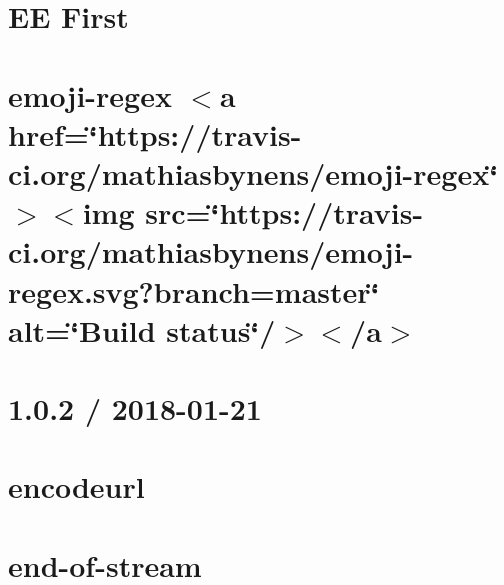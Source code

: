 \let\mypdfximage\pdfximage\def\pdfximage{\immediate\mypdfximage}\documentclass[twoside]{book}
\newcommand{\+}{\discretionary{\mbox{\scriptsize$\hookleftarrow$}}{}{}}
\begin{document}
\chapter{EE First}
\label{md__c_1__git_hub__p_r_o_y_e_c_t_o-_i_i_i-_g_o_t_rest-api_node_modules_ee-first__r_e_a_d_m_e}

\chapter{emoji-\/regex $<$a href=\char`\"{}https\+://travis-\/ci.\+org/mathiasbynens/emoji-\/regex\char`\"{}$>$$<$img src=\char`\"{}https\+://travis-\/ci.\+org/mathiasbynens/emoji-\/regex.\+svg?branch=master\char`\"{} alt=\char`\"{}\+Build status\char`\"{}/$>$$<$/a$>$}
\label{md__c_1__git_hub__p_r_o_y_e_c_t_o-_i_i_i-_g_o_t_rest-api_node_modules_emoji-regex__r_e_a_d_m_e}

\chapter{1.0.2 / 2018-\/01-\/21}
\label{md__c_1__git_hub__p_r_o_y_e_c_t_o-_i_i_i-_g_o_t_rest-api_node_modules_encodeurl__h_i_s_t_o_r_y}

\chapter{encodeurl}
\label{md__c_1__git_hub__p_r_o_y_e_c_t_o-_i_i_i-_g_o_t_rest-api_node_modules_encodeurl__r_e_a_d_m_e}

\chapter{end-\/of-\/stream}
\label{md__c_1__git_hub__p_r_o_y_e_c_t_o-_i_i_i-_g_o_t_rest-api_node_modules_end-of-stream__r_e_a_d_m_e}

\end{document}
